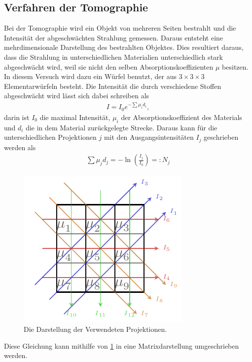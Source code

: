 \subsection{Verfahren der Tomographie}
Bei der Tomographie wird ein Objekt von mehreren Seiten bestrahlt und die Intensität der abgeschwächten Strahlung gemessen.
Daraus entsteht eine mehrdimensionale Darstellung des bestrahlten Objektes.
Dies resultiert daraus, dass die Strahlung in unterschiedlichen Materialien unterschiedlich stark abgeschwächt wird, weil sie nicht den selben Absorptionskoeffizienten $\mu$ besitzen.
\FloatBarrier
In diesem Versuch wird dazu ein Würfel benutzt, der aus $3\times3\times3$ Elementarwürfeln besteht.
Die Intensität die durch verschiedene Stoffen abgeschwächt wird lässt sich dabei schreiben als
\begin{align}
	I = I_0e^{-\sum \mu_i d_i},
\end{align}
darin ist $I_0$ die maximal Intensität, $\mu_i$ der Absorptionskoeffizient des Materials und $d_i$ die in dem Material zurückgelegte Strecke. 
Daraus kann für die unterschiedlichen Projektionen $j$ mit den Ausgangsintensitäten $I_j$ geschrieben werden als
\begin{align}
	\sum \mu_j d_j = -\ln\left(\frac{I_j}{I_0}\right)=:N_j
\end{align}


\begin{figure}[h]
	\centering
	\includegraphics[scale=1.75]{../Grafiken/Tikz/tikz-Projektionen.pdf}
	\caption{Die Darstellung der Verwendeten Projektionen.\label{fig:Projektion}}
\end{figure}
\FloatBarrier

Diese Gleichung kann mithilfe von \cref{fig:Projektion} in eine Matrixdarstellung umgeschrieben werden.

